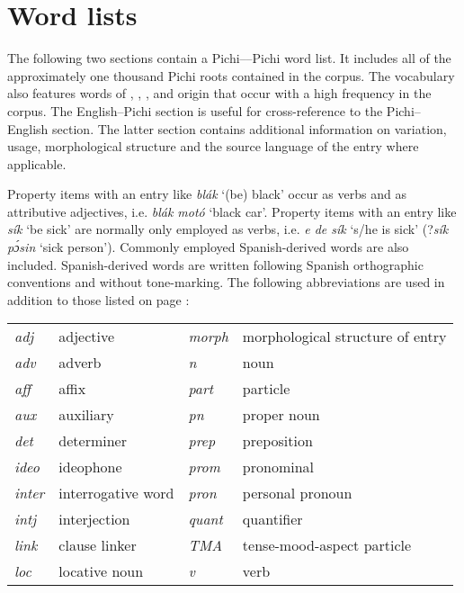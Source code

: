 \chapter{Word lists}
The following two sections contain a Pichi––Pichi word list. It includes all of the approximately one thousand Pichi roots contained in the corpus. The vocabulary also features words of , , , and  origin that occur with a high frequency in the corpus. The English–Pichi section is useful for cross-reference to the Pichi–English section. The latter section contains additional information on variation, usage, morphological structure and the source language of the entry where applicable. 


Property items with an entry like \textit{blák} ‘(be) black’ occur as verbs and as attributive adjectives, i.e. \textit{blák motó} ‘black car’. Property items with an entry like \textit{sík} ‘be sick’ are normally only employed as verbs, i.e. \textit{e de sík} ‘s/he is sick’ (?\textit{sík pɔ́sin} ‘sick person’). Commonly employed Spanish-derived words are also included. Spanish-derived words are written following Spanish orthographic conventions and without tone-marking. The following abbreviations are used in addition to those listed on page \pageref{sec:abbr}:

\bigskip

\begin{tabularx}{\textwidth}{lllQ}
\itshape adj & adjective &             \itshape morph & morphological structure of entry\\
\itshape adv & adverb &                \itshape n & noun\\
\itshape aff & affix &                 \itshape part & particle\\
\itshape aux & auxiliary &             \itshape pn & proper noun\\
\itshape det & determiner &            \itshape prep & preposition\\
\itshape ideo & ideophone &            \itshape prom & pronominal\\
\itshape inter & interrogative word \phantom{xxx} &  \itshape pron & personal pronoun\\
\itshape intj & interjection &         \itshape quant & quantifier\\
\itshape link & clause linker &        \itshape TMA & tense-mood-aspect particle\\
\itshape loc & locative noun &         \itshape v & verb\\
\end{tabularx}

